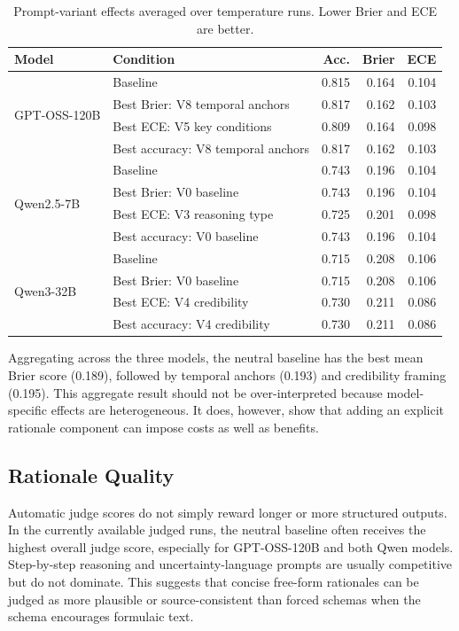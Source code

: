 \documentclass[11pt]{article}
\begin{document}
\begin{table}[t]
\centering
\small
\begin{tabular}{llrrr}
\toprule
Model & Condition & Acc. & Brier & ECE \\
\midrule
\multirow{4}{*}{GPT-OSS-120B}
& Baseline & 0.815 & 0.164 & 0.104 \\
& Best Brier: V8 temporal anchors & 0.817 & 0.162 & 0.103 \\
& Best ECE: V5 key conditions & 0.809 & 0.164 & 0.098 \\
& Best accuracy: V8 temporal anchors & 0.817 & 0.162 & 0.103 \\
\midrule
\multirow{4}{*}{Qwen2.5-7B}
& Baseline & 0.743 & 0.196 & 0.104 \\
& Best Brier: V0 baseline & 0.743 & 0.196 & 0.104 \\
& Best ECE: V3 reasoning type & 0.725 & 0.201 & 0.098 \\
& Best accuracy: V0 baseline & 0.743 & 0.196 & 0.104 \\
\midrule
\multirow{4}{*}{Qwen3-32B}
& Baseline & 0.715 & 0.208 & 0.106 \\
& Best Brier: V0 baseline & 0.715 & 0.208 & 0.106 \\
& Best ECE: V4 credibility & 0.730 & 0.211 & 0.086 \\
& Best accuracy: V4 credibility & 0.730 & 0.211 & 0.086 \\
\bottomrule
\end{tabular}
\caption{Prompt-variant effects averaged over temperature runs. Lower Brier and ECE are better.}
\label{tab:variant-best}
\end{table}

Aggregating across the three models, the neutral baseline has the best mean Brier score (0.189), followed by temporal anchors (0.193) and credibility framing (0.195).
This aggregate result should not be over-interpreted because model-specific effects are heterogeneous.
It does, however, show that adding an explicit rationale component can impose costs as well as benefits.

\subsection{Rationale Quality}

Automatic judge scores do not simply reward longer or more structured outputs.
In the currently available judged runs, the neutral baseline often receives the highest overall judge score, especially for GPT-OSS-120B and both Qwen models.
Step-by-step reasoning and uncertainty-language prompts are usually competitive but do not dominate.
This suggests that concise free-form rationales can be judged as more plausible or source-consistent than forced schemas when the schema encourages formulaic text.
\end{document}
